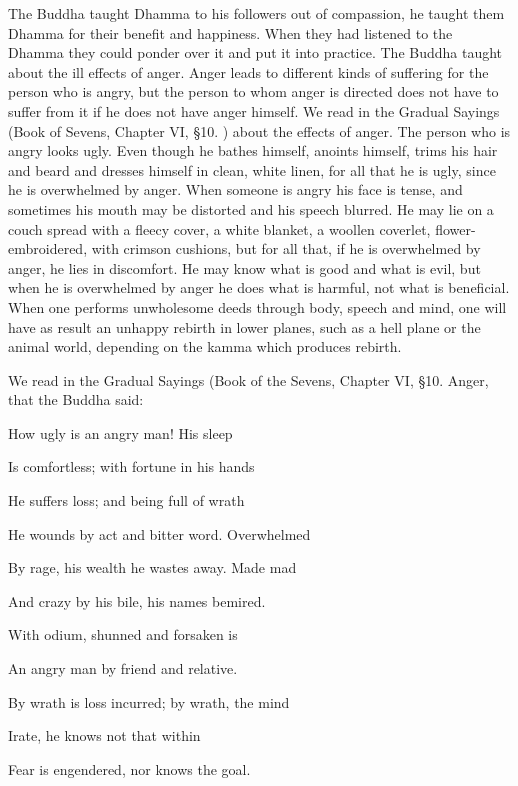 \documentclass[12pt,twoside]{article}
\begin{document}
\bigskip

The Buddha taught Dhamma to his followers out of compassion, he taught
them Dhamma for their benefit and happiness. When they had listened to
the Dhamma they could ponder over it and put it into practice. The
Buddha taught about the ill effects of anger. Anger leads to different
kinds of suffering for the person who is angry, but the person to whom
anger is directed does not have to suffer from it if he does not have
anger himself. We read in the Gradual Sayings (Book of Sevens, Chapter
VI, {\S}10. ) about the effects of anger. The person who is angry looks
ugly. Even though he bathes himself, anoints himself, trims his hair
and beard and dresses himself in clean, white linen, for all that he is
ugly, since he is overwhelmed by anger. When someone is angry his face
is tense, and sometimes his mouth may be distorted and his speech
blurred. He may lie on a couch spread with a fleecy cover, a white
blanket, a woollen coverlet, flower{}-embroidered, with crimson
cushions, but for all that, if he is overwhelmed by anger, he lies in
discomfort. He may know what is good and what is evil, but when he is
overwhelmed by anger he does what is harmful, not what is beneficial.
When one performs unwholesome deeds through body, speech and mind, one
will have as result an unhappy rebirth in lower planes, such as a hell
plane or the animal world, depending on the kamma which produces
rebirth. 

We read in the Gradual Sayings (Book of the Sevens, Chapter VI, {\S}10.
Anger, that the Buddha said:


\bigskip

How ugly is an angry man! His sleep

Is comfortless; with fortune in his hands 

He suffers loss; and being full of wrath

He wounds by act and bitter word. Overwhelmed

By rage, his wealth he wastes away. Made mad

And crazy by his bile, his name{\textquotesingle}s bemired. 

With odium, shunned and forsaken is

An angry man by friend and relative. 

By wrath is loss incurred; by wrath, the mind

Irate, he knows not that within

Fear is engendered, nor knows the goal. 
\end{document}
